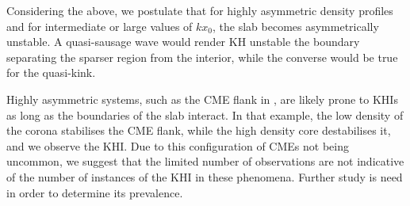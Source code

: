 Considering the above, we postulate that for highly asymmetric density profiles and for intermediate or large values of $k x_0$, the slab becomes asymmetrically unstable.
A quasi-sausage wave would render KH unstable the boundary separating the sparser region from the interior, while the converse would be true for the quasi-kink.

Highly asymmetric systems, such as the CME flank in \cite{Foullon2011}, are likely prone to KHIs as long as the boundaries of the slab interact.
In that example, the low density of the corona stabilises the CME flank, while the high density core destabilises it, and we observe the KHI.
Due to this configuration of CMEs not being uncommon, we suggest that the limited number of observations are not indicative of the number of instances of the KHI in these phenomena.
Further study is need in order to determine its prevalence.
